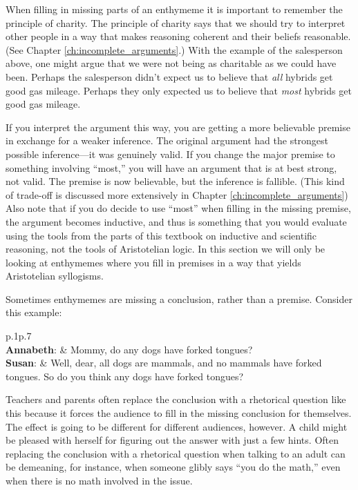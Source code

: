When filling in missing parts of an enthymeme it is important to remember the principle of charity. The principle of charity says that we should try to interpret other people in a way that makes reasoning coherent and their beliefs reasonable. (See Chapter \ref{ch:incomplete_arguments}.) With the example of the salesperson above, one might argue that we were not being as charitable as we could have been. Perhaps the salesperson didn't expect us to believe that \textit{all} hybrids get good gas mileage. Perhaps they only expected us to believe that \textit{most} hybrids get good gas mileage.

If you interpret the argument this way, you are getting a more believable premise in exchange for a weaker inference. The original argument had the strongest possible inference---it was genuinely valid. If you change the major premise to something involving ``most,'' you will have an argument that is at best strong, not  valid. The premise is now believable, but the inference is fallible.  (This kind of trade-off is discussed more extensively in Chapter \ref{ch:incomplete_arguments}) Also note that if you do decide to use ``most'' when filling in the missing premise, the argument becomes inductive, and thus is something that you would evaluate using the tools from the parts of this textbook on inductive and scientific reasoning, not the tools of Aristotelian logic. In this section we will only be looking at enthymemes where you fill in premises in a way that yields Aristotelian syllogisms.

Sometimes enthymemes are missing a conclusion, rather than a premise. Consider this example:

\begin{tabu}{p{.1\linewidth}p{.7\linewidth}}
\\
\textbf{Annabeth}: & Mommy, do any dogs have forked tongues? \\
\textbf{Susan}:  & Well, dear, all dogs are mammals, and no mammals have forked tongues. So do you think any dogs have forked tongues?\\
\end{tabu}

Teachers and parents often replace the conclusion with a rhetorical question like this because it forces the audience to fill in the missing conclusion for themselves. The effect is going to be different for different audiences, however. A child might be pleased with herself for figuring out the answer with just a few hints. Often replacing the conclusion with a rhetorical question when talking to an adult can be demeaning, for instance, when someone glibly says ``you do the math,'' even when there is no math involved in the issue.


